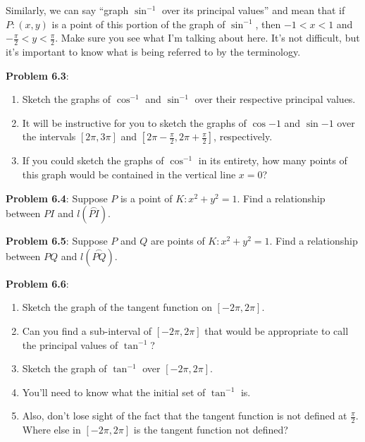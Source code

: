 \documentclass[english]{book}
\newcommand{\arc}[1]{\overset{\frown}{#1} }
\begin{document}
Similarly, we can say ``graph $\sin^{-1}$ over its principal values'' and mean that if $P:(x,y)$ is a point of this portion of the graph of $\sin^{-1}$, then $-1<x<1$ and $-\frac{\pi}{2} < y < \frac{\pi}{2}$. Make sure you see what I'm talking about here. It's not difficult, but it's important to know what is being referred to by the terminology.

\vspace{0.3cm}

\textbf{Problem 6.3}:
\begin{enumerate}[\hspace{1cm}a)]
  \item Sketch the graphs of $\cos^{-1}$ and $\sin^{-1}$ over their respective principal values.
  \item It will be instructive for you to sketch the graphs of $\cos{-1}$ and $\sin{-1}$ over the intervals $[2\pi,3\pi]$ and $[2\pi-\frac{\pi}{2}, 2\pi+\frac{\pi}{2}]$, respectively.
  \item If you could sketch the graphs of $\cos^{-1}$ in its entirety, how many points of this graph would be contained in the vertical line $x=0$?
\end{enumerate}

\textbf{Problem 6.4}: Suppose $P$ is a point of $K:x^2+y^2=1$. Find a relationship between $PI$ and $l(\arc{PI})$.

\vspace{0.3cm}

\textbf{Problem 6.5}: Suppose $P$ and $Q$ are points of $K:x^2+y^2=1$. Find a relationship between $PQ$ and $l(\arc{PQ})$.

\vspace{0.3cm}

\textbf{Problem 6.6}: 
\begin{enumerate}[\hspace{1cm}a)]
  \item Sketch the graph of the tangent function on $[-2\pi,2\pi]$.
  \item Can you find a sub-interval of $[-2\pi,2\pi]$ that would be appropriate to call the principal values of $\tan^{-1}$?
  \item Sketch the graph of $\tan^{-1}$ over $[-2\pi,2\pi]$.
  \item You'll need to know what the initial set of $\tan^{-1}$ is.
  \item Also, don't lose sight of the fact that the tangent function is not defined at $\frac{\pi}{2}$. Where else in $[-2\pi,2\pi]$ is the tangent function not defined?
\end{enumerate}
\end{document}
